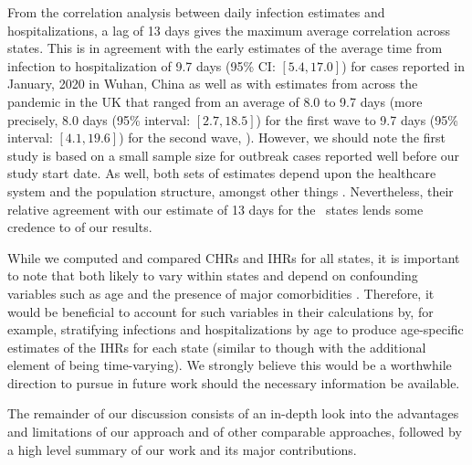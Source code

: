 \documentclass{article}
\begin{document}
From the correlation analysis between daily infection estimates and
hospitalizations, a lag of 13 days gives the maximum average correlation 
across states. This is in agreement with the early estimates of the average time from
infection to hospitalization of 9.7 days (95\% CI: $[5.4, 17.0]$) for
cases reported in January, 2020 in Wuhan, China as well as with estimates from
across the pandemic in the UK that ranged from an average of 8.0 to 9.7
days (more precisely, 8.0 days (95\% interval: $[2.7, 18.5]$) for the first
wave to 9.7 days (95\% interval: $[4.1, 19.6]$) for the second wave,
\citep{ward2021understanding}). However, we should note the first study is based
on a small sample size for outbreak cases reported well before our study start
date. As well, both sets of estimates depend upon the healthcare system and the
population structure, amongst other things \citep{ward2021understanding}.
Nevertheless, their relative agreement with our estimate of 13 days for the \US\
states lends some credence to of our results. 

While we computed and compared CHRs and IHRs for all states, it is important to note that both
likely to vary within states and depend on confounding variables such as
 age and the presence of major comorbidities \citep{russell2023comorbidities}.
 Therefore, it would be beneficial to account for such variables in their
 calculations by, for example, stratifying infections and hospitalizations by
 age to produce age-specific estimates of the IHRs for each state (similar to
 \citealp{fox2023disproportionate} though with the additional element of being
 time-varying). We strongly believe this would be a worthwhile direction to
 pursue in future work should the necessary information be available. 

The remainder of our discussion consists of an in-depth look into the advantages and
limitations of our approach and of other comparable approaches, followed by a
high level summary of our work and its major contributions. 
\end{document}
